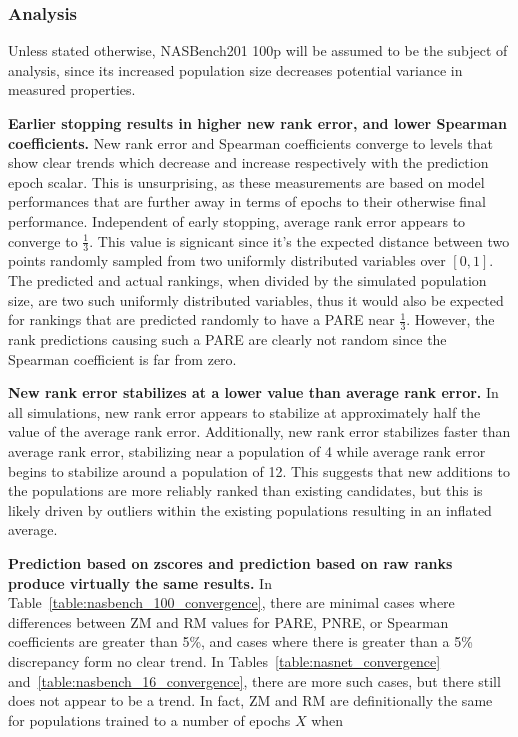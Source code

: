 \documentclass[twocolumn]{article}
\begin{document}
\subsubsection{Analysis}

Unless stated otherwise, NASBench201 100p will be assumed to be the subject of analysis, since its increased population size decreases potential variance in measured properties.

\textbf{Earlier stopping results in higher new rank error, and lower Spearman coefficients.}
New rank error and Spearman coefficients converge to levels that show clear trends which decrease and increase respectively with the prediction epoch scalar.
This is unsurprising, as these measurements are based on model performances that are further away in terms of epochs to their
otherwise final performance. 
Independent of early stopping, average rank error appears to converge to $\frac{1}{3}$.
This value is signicant since it's the expected distance between two points randomly sampled from two uniformly distributed variables over $[0, 1]$.
The predicted and actual rankings, when divided by the simulated population size, are two such uniformly distributed variables, 
thus it would also be expected for rankings that are predicted randomly to have a PARE near $\frac{1}{3}$.
However, the rank predictions causing such a PARE are clearly not random since the Spearman coefficient is far from zero.

\textbf{New rank error stabilizes at a lower value than average rank error.}
In all simulations, new rank error appears to stabilize at approximately half the value of the average rank error.
Additionally, new rank error stabilizes faster than average rank error, stabilizing near a population of 4 while
average rank error begins to stabilize around a population of 12.
This suggests that new additions to the populations are more reliably ranked than existing candidates,
but this is likely driven by outliers within the existing populations resulting in an inflated average.

\textbf{Prediction based on zscores and prediction based on raw ranks produce virtually the same results.}
In Table~\ref{table:nasbench_100_convergence}, there are minimal cases where differences between ZM and RM values for PARE, PNRE, or Spearman coefficients are greater than 5\%,
and cases where there is greater than a 5\% discrepancy form no clear trend.
In Tables~\ref{table:nasnet_convergence} and~\ref{table:nasbench_16_convergence}, there are more such cases, but there still does not appear to be a trend.
In fact, ZM and RM are definitionally the same for populations trained to a number of epochs $X$ when
\end{document}
